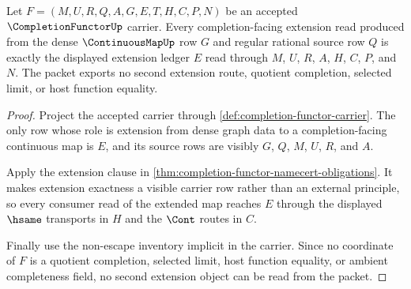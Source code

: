 \begin{theorem}
\label{thm:completion-functor-extension-ledger-exactness}
Let $F=(M,U,R,Q,A,G,E,T,H,C,P,N)$ be an accepted $\CompletionFunctorUp$ carrier. Every completion-facing extension read produced from the dense $\ContinuousMapUp$ row $G$ and regular rational source row $Q$ is exactly the displayed extension ledger $E$ read through $M$, $U$, $R$, $A$, $H$, $C$, $P$, and $N$. The packet exports no second extension route, quotient completion, selected limit, or host function equality.
\end{theorem}
\begin{proof}
Project the accepted carrier through \autoref{def:completion-functor-carrier}. The only row whose role is extension from dense graph data to a completion-facing continuous map is $E$, and its source rows are visibly $G$, $Q$, $M$, $U$, $R$, and $A$.

Apply the extension clause in \autoref{thm:completion-functor-namecert-obligations}. It makes extension exactness a visible carrier row rather than an external principle, so every consumer read of the extended map reaches $E$ through the displayed $\hsame$ transports in $H$ and the $\Cont$ routes in $C$.

Finally use the non-escape inventory implicit in the carrier. Since no coordinate of $F$ is a quotient completion, selected limit, host function equality, or ambient completeness field, no second extension object can be read from the packet.
\end{proof}

